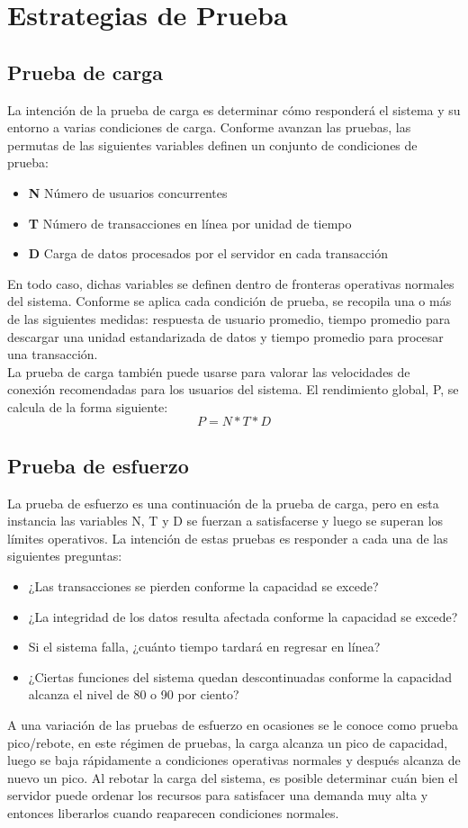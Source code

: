 \section{Estrategias de Prueba}
\subsection{Prueba de carga}
\noindent
La intención de la prueba de carga es determinar cómo responderá el sistema y su entorno a varias condiciones de carga. Conforme avanzan las pruebas, las permutas de las siguientes variables definen un conjunto de condiciones de prueba:
\begin{itemize}
    \item \textbf{N} Número de usuarios concurrentes
    \item \textbf{T} Número de transacciones en línea por unidad de tiempo
    \item \textbf{D} Carga de datos procesados por el servidor en cada transacción
\end{itemize}
En todo caso, dichas variables se definen dentro de fronteras operativas normales del sistema. Conforme se aplica cada condición de prueba, se recopila una o más de las siguientes medidas: respuesta de usuario promedio, tiempo promedio para descargar una unidad estandarizada de datos y tiempo promedio para procesar una transacción.\\
La prueba de carga también puede usarse para valorar las velocidades de conexión recomendadas para los usuarios del sistema. El rendimiento global, P, se calcula de la forma siguiente:
\begin{equation}
    P= N * T * D
\end{equation}
\subsection{Prueba de esfuerzo}
\noindent
La prueba de esfuerzo es una continuación de la prueba de carga, pero en esta instancia las variables N, T y D se fuerzan a satisfacerse y luego se superan los límites operativos. La intención de estas pruebas es responder a cada una de las siguientes preguntas:
\begin{itemize}
    \item ¿Las transacciones se pierden conforme la capacidad se excede?
    \item ¿La integridad de los datos resulta afectada conforme la capacidad se excede?
    \item Si el sistema falla, ¿cuánto tiempo tardará en regresar en línea?
    \item ¿Ciertas funciones del sistema quedan descontinuadas conforme la capacidad alcanza el nivel de 80 o 90 por ciento?
\end{itemize}
A una variación de las pruebas de esfuerzo en ocasiones se le conoce como prueba pico/rebote, en este régimen de pruebas, la carga alcanza un pico de capacidad, 
luego se baja rápidamente a condiciones operativas normales y después alcanza de nuevo un pico. Al rebotar la carga del sistema, es posible determinar cuán bien el servidor puede ordenar los recursos para satisfacer una demanda muy alta y entonces liberarlos cuando reaparecen condiciones normales.